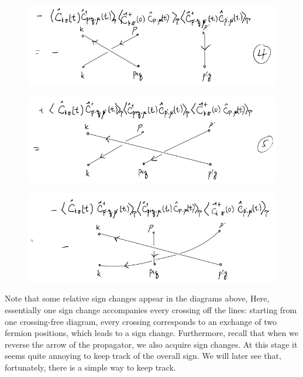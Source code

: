 \begin{figure}[ht]
    \centering
    \includegraphics[width=\textwidth]{jupyterbook/data/fig/lec16-fig10.png}
\end{figure}

\begin{figure}[ht]
    \centering
    \includegraphics[width=\textwidth]{jupyterbook/data/fig/lec16-fig11.png}
\end{figure}

\begin{figure}[ht]
    \centering
    \includegraphics[width=\textwidth]{jupyterbook/data/fig/lec16-fig12.png}
\end{figure}

Note that some relative sign changes appear in the diagrams above, Here, essentially one sign change accompanies every crossing off the lines: starting from one crossing-free diagram, every crossing corresponds to an exchange of two fermion positions, which leads to a sign change. Furthermore, recall that when we reverse the arrow of the propagator, we also acquire sign changes. At this stage it seems quite annoying to keep track of the overall sign. We will later see that, fortunately, there is a simple way to keep track.
